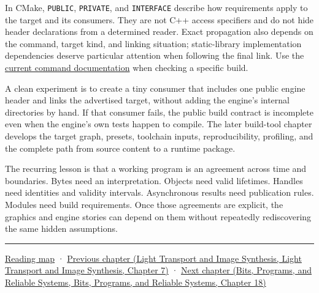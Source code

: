 In CMake, \texttt{PUBLIC}, \texttt{PRIVATE}, and \texttt{INTERFACE} describe how requirements apply to the target and its consumers. They are not C++ access specifiers and do not hide header declarations from a determined reader. Exact propagation also depends on the command, target kind, and linking situation; static-library implementation dependencies deserve particular attention when following the final link. Use the \href{https://cmake.org/cmake/help/latest/command/target_link_libraries.html}{current command documentation} when checking a specific build.

A clean experiment is to create a tiny consumer that includes one public engine header and links the advertised target, without adding the engine's internal directories by hand. If that consumer fails, the public build contract is incomplete even when the engine's own tests happen to compile. The later build-tool chapter develops the target graph, presets, toolchain inputs, reproducibility, profiling, and the complete path from source content to a runtime package.

The recurring lesson is that a working program is an agreement across time and boundaries. Bytes need an interpretation. Objects need valid lifetimes. Handles need identities and validity intervals. Asynchronous results need publication rules. Modules need build requirements. Once those agreements are explicit, the graphics and engine stories can depend on them without repeatedly rediscovering the same hidden assumptions.

\begin{center}\rule{0.5\linewidth}{0.5pt}\end{center}

\hyperref[volume-reading-map]{Reading map} · \href{../04-Light-Transport-and-Image-Synthesis/main.pdf\#nameddest=03-visual-computing-i-ch015-rasterization-foundations-and-renderer-evidence}{Previous chapter (Light Transport and Image Synthesis, Light Transport and Image Synthesis, Chapter 7)} · \href{../01-Bits-Programs-and-Reliable-Systems/main.pdf\#nameddest=03-visual-computing-i-ch017-build-test-and-reproduce-the-program}{Next chapter (Bits, Programs, and Reliable Systems, Bits, Programs, and Reliable Systems, Chapter 18)}
